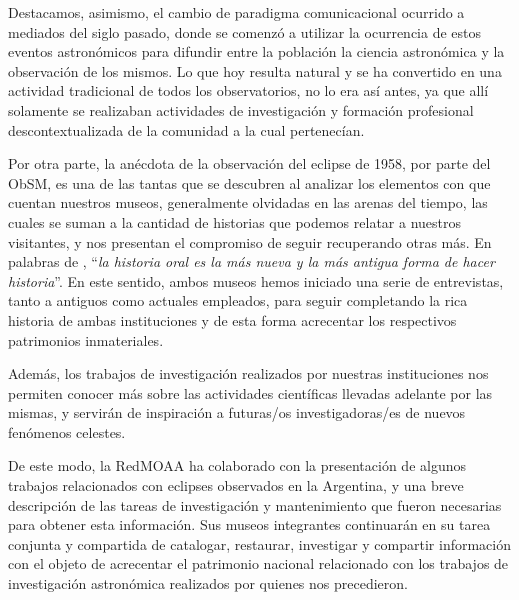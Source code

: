 \documentclass[baaa]{baaa}
\begin{document}
Destacamos, asimismo, el cambio de paradigma comunicacional ocurrido a mediados del siglo pasado, donde se comenzó a utilizar la ocurrencia de estos eventos astronómicos para 
difundir entre la población la ciencia astronómica y la observación de los mismos. Lo que hoy resulta natural y se ha convertido en una actividad tradicional de todos los observatorios,
no lo era así antes, ya que allí solamente se realizaban actividades de investigación y formación profesional descontextualizada de la comunidad a la cual pertenecían.

Por otra parte, la anécdota de la observación del eclipse de 1958, por parte del ObSM, es una de las tantas que se descubren al analizar los elementos con que cuentan nuestros museos,
generalmente olvidadas en las arenas del tiempo, las cuales se suman a la cantidad de historias que podemos relatar a nuestros visitantes, y nos presentan el compromiso de seguir recuperando otras más.
En palabras de \citet{thompson17}, ``\textit{la historia oral es la más nueva y la más antigua forma de hacer historia}''.
En este sentido, ambos museos hemos iniciado una serie de entrevistas, tanto a antiguos como actuales empleados, para seguir completando la rica historia de ambas 
instituciones y de esta forma acrecentar los respectivos patrimonios inmateriales. 

Además, los trabajos de investigación realizados por nuestras instituciones nos permiten conocer más sobre las actividades científicas llevadas adelante por las mismas,
y servirán de inspiración a futuras/os investigadoras/es de nuevos fenómenos celestes. 



De este modo, la RedMOAA ha colaborado con la presentación de algunos trabajos relacionados con eclipses observados en la Argentina, y una breve descripción de las tareas
de investigación y mantenimiento que fueron necesarias para obtener esta información. Sus museos integrantes continuarán en su tarea conjunta y compartida de catalogar,
restaurar, investigar y compartir información con el objeto de acrecentar el patrimonio nacional relacionado con los trabajos de investigación astronómica realizados por quienes
nos precedieron. 
\end{document}
